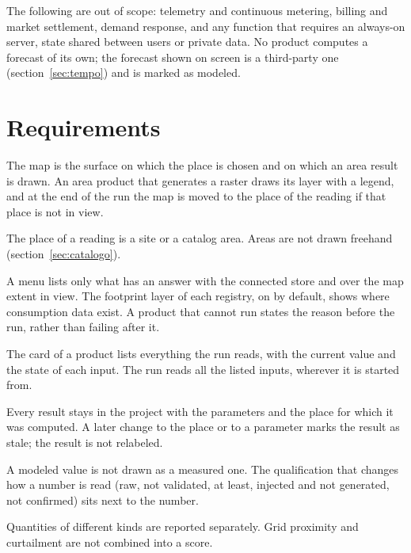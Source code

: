\documentclass[10pt,a4paper,oneside]{article}
\begin{document}
The following are out of scope: telemetry and continuous metering, billing
and market settlement, demand response, and any function that requires an
always-on server, state shared between users or private data. No product
computes a forecast of its own; the forecast shown on screen is a third-party
one (section~\ref{sec:tempo}) and is marked as modeled.

\section{Requirements}

\begin{description}[leftmargin=2.4em,labelwidth=2em,font=\bfseries]
  \item[R1] The map is the surface on which the place is chosen and on which
    an area result is drawn. An area product that generates a raster draws
    its layer with a legend, and at the end of the run the map is moved to
    the place of the reading if that place is not in view.
  \item[R2] The place of a reading is a site or a catalog area. Areas are
    not drawn freehand (section~\ref{sec:catalogo}).
  \item[R3] A menu lists only what has an answer with the connected store
    and over the map extent in view. The footprint layer of each registry,
    on by default, shows where consumption data exist. A product that cannot
    run states the reason before the run, rather than failing after it.
  \item[R4] The card of a product lists everything the run reads, with the
    current value and the state of each input. The run reads all the listed
    inputs, wherever it is started from.
  \item[R5] Every result stays in the project with the parameters and the
    place for which it was computed. A later change to the place or to a
    parameter marks the result as stale; the result is not relabeled.
  \item[R6] A modeled value is not drawn as a measured one. The
    qualification that changes how a number is read (raw, not validated, at
    least, injected and not generated, not confirmed) sits next to the
    number.
  \item[R7] Quantities of different kinds are reported separately. Grid
    proximity and curtailment are not combined into a score.

\end{description}
\end{document}
